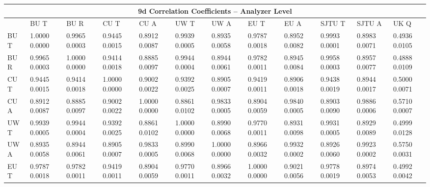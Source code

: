 

\begin{landscape}
\begin{table}
\small
\centering
\renewcommand{\arraystretch}{1.5}
\begin{tabularx}{1\linewidth}{@{\extracolsep{\fill}}lXXXXXXXXXXX}
  \toprule
  	\multicolumn{12}{c}{{\normalsize 9d Correlation Coefficients -- Analyzer Level}} \\
  \midrule
  	       & BU T & BU R & CU T & CU A & UW T & UW A & EU T & EU A & SJTU T & SJTU A & UK Q \\
  \midrule
	BU T   & 1.0000 0.0000 & 0.9965 0.0003 & 0.9445 0.0015 & 0.8912 0.0087 & 0.9939 0.0005 & 0.8935 0.0058 & 0.9787 0.0018 & 0.8952 0.0082 & 0.9993 0.0001 & 0.8983 0.0071 & 0.4936 0.0105  \\
	BU R   & 0.9965 0.0003 & 1.0000 0.0000 & 0.9414 0.0018 & 0.8885 0.0097 & 0.9944 0.0004 & 0.8944 0.0061 & 0.9782 0.0011 & 0.8945 0.0084 & 0.9958 0.0003 & 0.8957 0.0077 & 0.4888 0.0109  \\
	CU T   & 0.9445 0.0015 & 0.9414 0.0018 & 1.0000 0.0000 & 0.9002 0.0022 & 0.9392 0.0025 & 0.8905 0.0007 & 0.9419 0.0011 & 0.8906 0.0018 & 0.9438 0.0019 & 0.8944 0.0017 & 0.5000 0.0071  \\
	CU A   & 0.8912 0.0087 & 0.8885 0.0097 & 0.9002 0.0022 & 1.0000 0.0000 & 0.8861 0.0102 & 0.9833 0.0005 & 0.8904 0.0059 & 0.9840 0.0005 & 0.8903 0.0090 & 0.9886 0.0006 & 0.5710 0.0007  \\
	UW T   & 0.9939 0.0005 & 0.9944 0.0004 & 0.9392 0.0025 & 0.8861 0.0102 & 1.0000 0.0000 & 0.8990 0.0068 & 0.9770 0.0011 & 0.8931 0.0098 & 0.9931 0.0005 & 0.8929 0.0089 & 0.4999 0.0128  \\
	UW A   & 0.8935 0.0058 & 0.8944 0.0061 & 0.8905 0.0007 & 0.9833 0.0005 & 0.8990 0.0068 & 1.0000 0.0000 & 0.8966 0.0032 & 0.9932 0.0002 & 0.8926 0.0060 & 0.9923 0.0002 & 0.5750 0.0031  \\
	EU T   & 0.9787 0.0018 & 0.9782 0.0011 & 0.9419 0.0011 & 0.8904 0.0059 & 0.9770 0.0011 & 0.8966 0.0032 & 1.0000 0.0000 & 0.9021 0.0056 & 0.9778 0.0019 & 0.8974 0.0053 & 0.4992 0.0042  \\

\end{tabularx}
\end{table}
\end{landscape}
